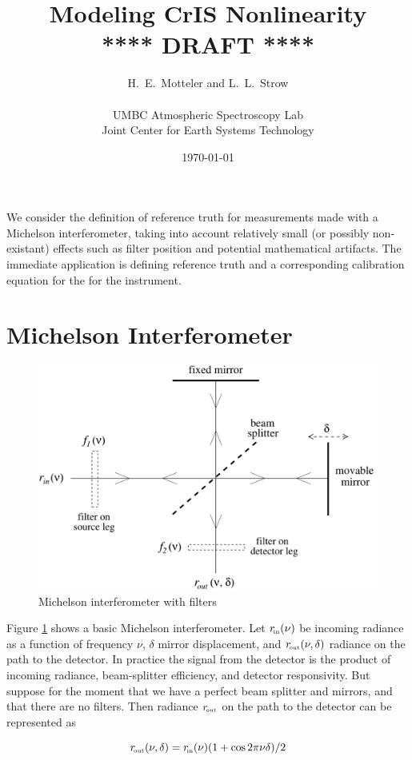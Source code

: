 \documentclass[12pt]{article}
\title{Modeling CrIS Nonlinearity \\
\vspace{3mm}
{****} DRAFT {****} \\
}
\author{H.~E.~Motteler and L.~L.~Strow \\
  \\
  UMBC Atmospheric Spectroscopy Lab \\
  Joint Center for Earth Systems Technology \\
}
\date{\today}
\begin{document}
\maketitle

We consider the definition of reference truth for measurements made
with a Michelson interferometer, taking into account relatively
small (or possibly non-existant) effects such as filter position and
potential mathematical artifacts.  The immediate application is
defining reference truth and a corresponding calibration equation
for the for the {\cris} instrument.

\section{Michelson Interferometer}

\begin{figure}
  \centering
  \includegraphics[scale=0.5]{figures/mich_filt2.pdf}
  \caption{Michelson interferometer with filters}
  \label{intf1}
\end{figure}

Figure \ref{intf1} shows a basic Michelson interferometer.  Let
$r_{\!\mbox{\tiny in}}(\nu)$ be incoming radiance as a function of frequency $\nu$,
$\delta$ mirror displacement, and $r_{\!\mbox{\tiny out}}(\nu, \delta)$ radiance on
the path to the detector.  In practice the signal from the detector
is the product of incoming radiance, beam-splitter efficiency, and
detector responsivity.  But suppose for the moment that we have a
perfect beam splitter and mirrors, and that there are no filters.
Then radiance $r_{\!\mbox{\tiny out}}$ on the path to the detector can be represented
as

\begin{equation}\label{eq1}
  r_{\!\mbox{\tiny out}}(\nu,\delta) = r_{\!\mbox{\tiny in}}(\nu)(1+\cos 2\pi\nu\delta)/2
\end{equation}
\end{document}
